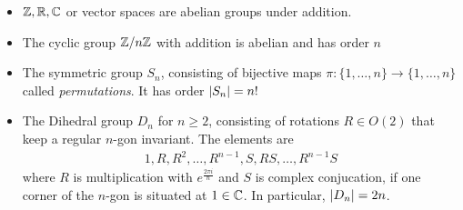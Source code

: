 \begin{ex}[]

\begin{itemize}
  \item $\mathbb{Z},\mathbb{R},\mathbb{C}$ or vector spaces are abelian groups under addition.
  \item The cyclic group $\mathbb{Z}/n\mathbb{Z}$ with addition is abelian and has order $n$
  \item The symmetric group $S_n$, consisting of bijective maps $\pi: \{1,\ldots,n\} \to \{1,\ldots,n\}$ called \emph{permutations}. It has order $\vert S_n\vert = n!$
  \item The Dihedral group $D_{n}$ for $n \geq 2$, consisting of rotations $R \in O(2)$ that keep a regular $n$-gon invariant. The elements are
    \begin{align*}
      1, R, R^2, \ldots, R^{n-1}, S, RS, \ldots, R^{n-1}S
    \end{align*}
    where $R$ is multiplication with $e^{\frac{2 \pi i}{n}}$ and $S$ is complex conjucation, if one corner of the $n$-gon is situated at $1 \in \mathbb{C}$. In particular, $\vert D_n\vert = 2n$.


\end{itemize}
\end{ex}
